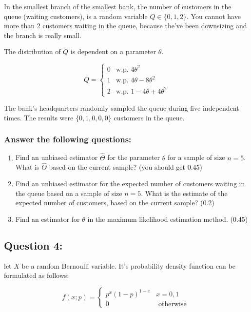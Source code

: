 \documentclass[
]{article}
\providecommand{\tightlist}{%
  \setlength{\itemsep}{0pt}\setlength{\parskip}{0pt}}
\begin{document}
In the smallest branch of the smallest bank, the number of customers in
the queue (waiting customers), is a random variable \(Q\in\{0,1,2\}\).
You cannot have more than 2 customers waiting in the queue, because
the've been downsizing and the branch is really small.

The distribution of \(Q\) is dependent on a parameter \(\theta\).

\[Q = \left\{\begin{array}{ll}0 & \text{w.p. }4\theta^2\\
1 & \text{w.p. }4\theta-8\theta^2\\
2 & \text{w.p. }1-4\theta+4\theta^2\end{array}\right.\]

The bank's headquarters randomly sampled the queue during five
independent times. The results were \(\{0,1,0,0,0\}\) customers in the
queue.

\hypertarget{answer-the-following-questions}{%
\subsubsection{Answer the following
questions:}\label{answer-the-following-questions}}

\begin{enumerate}
\def\labelenumi{\arabic{enumi}.}
\tightlist
\item
  Find an unbiased estimator \(\hat{\Theta}\) for the parameter
  \(\theta\) for a sample of size \(n=5\). What is \(\hat{\Theta}\)
  based on the current sample? (you should get 0.45)
\item
  Find an unbiased estimator for the expected number of customers
  waiting in the queue based on a sample of size \(n=5\). What is the
  estimate of the expected number of customers, based on the current
  sample? (0.2)
\item
  Find an estimator for \(\theta\) in the maximum likelihood estimation
  method. (0.45)
\end{enumerate}

\hypertarget{question-4}{%
\subsection{Question 4:}\label{question-4}}

let \(X\) be a random Bernoulli variable. It's probability density
function can be formulated as follows:

\[
f(x ; p)=\left\{\begin{array}{ll}{p^{x}(1-p)^{1-x}} & {x=0,1} \\ {0} & {\text { otherwise }}\end{array}\right.
\]
\end{document}
